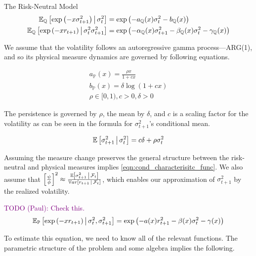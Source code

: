 \documentclass[11pt]{article}
\newcommand{\purple}[1]{\textcolor{purple}{#1}}
\newcommand*{\F}{\mathcal{F}}
\newcommand*{\Q}{\mathbb{Q}}
\newcommand*{\Phys}{\mathbb{P}}
\newcommand*{\E}{\mathbb{E}}
\newcommand*{\Var}{\mathbb{V}ar}
\newcommand{\mvert}[1][\middle]{\ensuremath{\,#1\vert\,}}
\begin{document}
\begin{defn}{The Risk-Neutral Model}
\begin{align}
    \E_{\Q}\left[\exp\left(-x  \sigma^2_{t+1}\right) \mvert \sigma^2_t\right] &= \exp\left(-a_{\Q}(x)
    \sigma_t^2 - b_{\Q}(x)\right) \\
    \E_{\Q}\left[\exp\left(-x  r_{t+1} \right)\mvert \sigma^2_t \sigma^2_{t+1}\right] &=
    \exp\left(-\alpha_{\Q}(x) \sigma^2_{t+1} - \beta_{\Q}(x) \sigma^2_t - \gamma_{\Q}(x)\right)
\end{align}
\end{defn}


We assume that the volatility follows an autoregressive gamma process---ARG(1), and so its physical measure
dynamics are governed by following equations.

\begin{gather}
    a_{\Phys}(x) = \frac{\rho x}{1 + c x}  \\
    b_{\Phys}(x) = \delta \log \left(1 + c x\right) \\
    \rho \in [0, 1), c > 0, \delta > 0 
\end{gather}

The persistence is governed by $\rho$, the mean by $\delta$, and $c$ is a scaling factor for the volatility as can
be seen in the formula for $\sigma^2_{t+1}$'s conditional mean.

\begin{equation}
    \E\left[\sigma^2_{t+1} \mvert \sigma^2_t\right] = c \delta + \rho \sigma^2_t
\end{equation}

Assuming the measure change preserves the general structure between the risk-neutral and physical measures implies
\cref{eqn:cond_characterisitc_func}.
We also assume that $\left[ \frac{\psi}{\phi} \right]^2 \approx \frac{\E \left[\sigma^2_{t+1} \mvert
\F_t\right]}{\Var\left[r_{t+1} \mvert \F_t\right]}$, which enables our approximation of $\sigma^2_{t+1}$ by the
realized volatility.

\purple{TODO (Paul): Check this.}
\begin{equation}
    \label{eqn:cond_characterisitc_func}
    \E_{\Phys}\left[\exp\left(- x r_{t+1}\right) \mvert \sigma_t^2, \sigma^2_{t+1}\right] = \exp\left(- a(x)
    r^2_{t+1} - \beta(x) \sigma^2_t - \gamma(x) \right) 
\end{equation}

To estimate this equation, we need to know all of the relevant functions.
The parametric structure of the problem and some algebra implies the following.
\end{document}
